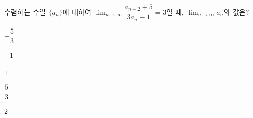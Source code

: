 수렴하는 수열 $\{a_n\}$에 대하여 $\displaystyle\lim_{n\to\infty}\dfrac{a_{n+2}+5}{3a_n-1}=3$일 때, $\displaystyle\lim_{n\to\infty}a_n$의 값은?
\begin{choices32}{\rule[-3ex]{0pt}{8ex}$-\dfrac{5}{3}$}{\rule[-3ex]{0pt}{8ex}$-1$}{\rule[-3ex]{0pt}{8ex}$1$}{\rule[-3ex]{0pt}{8ex}$\dfrac{5}{3}$}{\rule[-3ex]{0pt}{8ex}$2$}\end{choices32}
